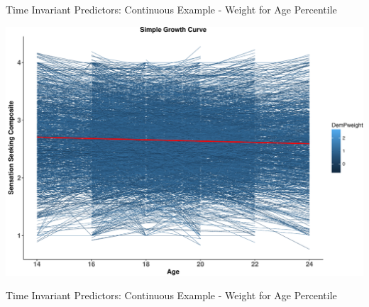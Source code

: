 \begin{frame}{Time Invariant Predictors: Continuous Example - Weight for
Age Percentile}

\includegraphics{Conditional_Models_files/figure-beamer/unnamed-chunk-8-1.pdf}

\end{frame}

\begin{frame}[fragile]{Time Invariant Predictors: Continuous Example -
Weight for Age Percentile}

\tiny

\begin{Shaded}
\begin{Highlighting}[]
\StringTok{ }\OperatorTok{~}\StringTok{ }\OperatorTok{+}\StringTok{ }\OperatorTok{+}\StringTok{ }\OperatorTok{*}\OperatorTok{+}\StringTok{ }\NormalTok{(}\OperatorTok{|}

\StringTok{ }\OperatorTok{~}\StringTok{ }\OperatorTok{+}\StringTok{ }\OperatorTok{+}\StringTok{ }\OperatorTok{*}\OperatorTok{+}\StringTok{ }
\StringTok{                }\OperatorTok{|}
\end{Highlighting}
\end{Shaded}

\normalsize

\end{frame}

